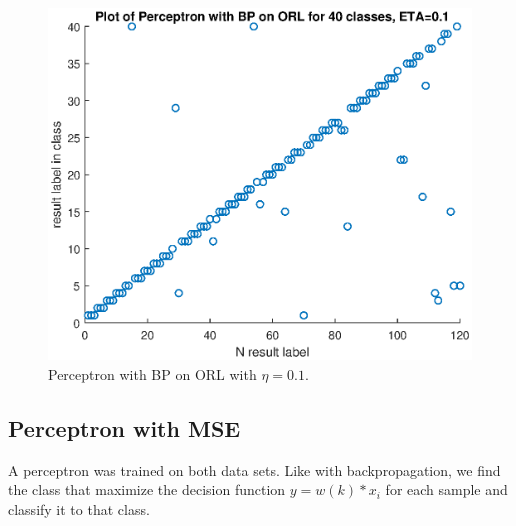 \documentclass[journal]{IEEEtran}
\begin{document}
\begin{figure}
	\centering
	\includegraphics[width=0.7\linewidth]{../ML/results/ORL_Perceptron_BP}
	\caption{Perceptron with BP on ORL with $\eta=0.1$.}
	\label{fig:orlperceptronbp}
\end{figure}

\subsection{Perceptron with MSE}

A perceptron was trained on both data sets. Like with backpropagation, we find the class that maximize the decision function $y = w(k)*x_{i}$ for each sample and classify it to that class.
























 
\end{document}
